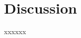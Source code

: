 \documentclass[a4paper, 11pt]{article}
\begin{document}

    \section*{Discussion}
    \label{sec:discussion}
    xxxxxx
\printbibliography
\end{document}
